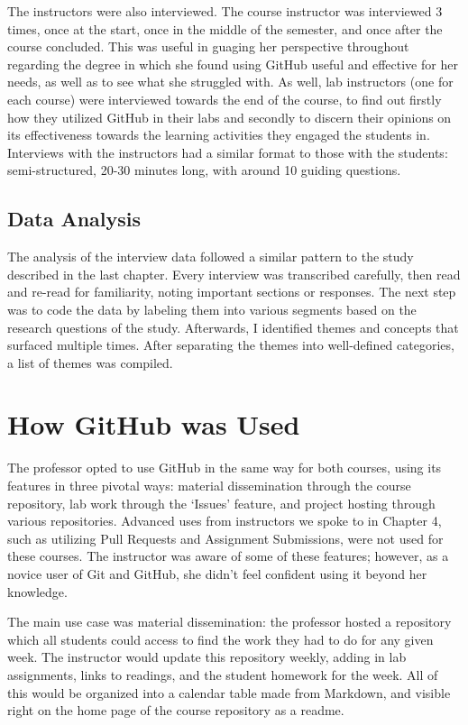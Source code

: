 The instructors were also interviewed. The course instructor was interviewed 3 times, once at the start, once in the middle of the semester, and once after the course concluded. This was useful in guaging her perspective throughout regarding the degree in which she found using GitHub useful and effective for her needs, as well as to see what she struggled with. As well, lab instructors (one for each course) were interviewed towards the end of the course, to find out firstly how they utilized GitHub in their labs and secondly to discern their opinions on its effectiveness towards the learning activities they engaged the students in. Interviews with the instructors had a similar format to those with the students: semi-structured, 20-30 minutes long, with around 10 guiding questions.


\subsection{Data Analysis}
The analysis of the interview data followed a similar pattern to the study described in the last chapter. Every interview was transcribed carefully, then read and re-read for familiarity, noting important sections or responses. The next step was to code the data by labeling them into various segments based on the research questions of the study. Afterwards, I identified themes and concepts that surfaced multiple times. After separating the themes into well-defined categories, a list of themes was compiled.


\section{How GitHub was Used}
The professor opted to use GitHub in the same way for both courses, using its features in three pivotal ways: material dissemination through the course repository, lab work through the `Issues' feature, and project hosting through various repositories. Advanced uses from instructors we spoke to in Chapter 4, such as utilizing Pull Requests and Assignment Submissions, were not used for these courses. The instructor was aware of some of these features; however, as a novice user of Git and GitHub, she didn't feel confident using it beyond her knowledge.

The main use case was material dissemination: the professor hosted a repository which all students could access to find the work they had to do for any given week. The instructor would update this repository weekly, adding in lab assignments, links to readings, and the student homework for the week. All of this would be organized into a calendar table made from Markdown, and visible right on the home page of the course repository as a readme.

